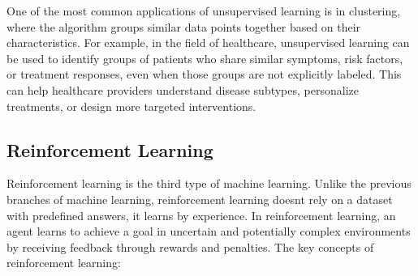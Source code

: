 One of the most common applications of unsupervised learning is in clustering, where the algorithm groups similar data points 
together based on their characteristics. For example, in the field of healthcare, unsupervised learning can be used to identify 
groups of patients who share similar symptoms, risk factors, or treatment responses, even when those groups are not explicitly 
labeled. This can help healthcare providers understand disease subtypes, personalize treatments, or design more targeted interventions.\cite{GoogleCloud-UL} 

\subsection{Reinforcement Learning}
Reinforcement learning is the third type of machine learning.
Unlike the previous branches of machine learning,
reinforcement learning doesnt rely on a dataset with predefined answers, it learns by experience.
In reinforcement learning, an agent learns to achieve a goal in
uncertain and potentially complex environments by receiving feedback
through rewards and penalties. \cite{RL-GeeksForGeeks}
\newline
The key concepts of reinforcement learning:
